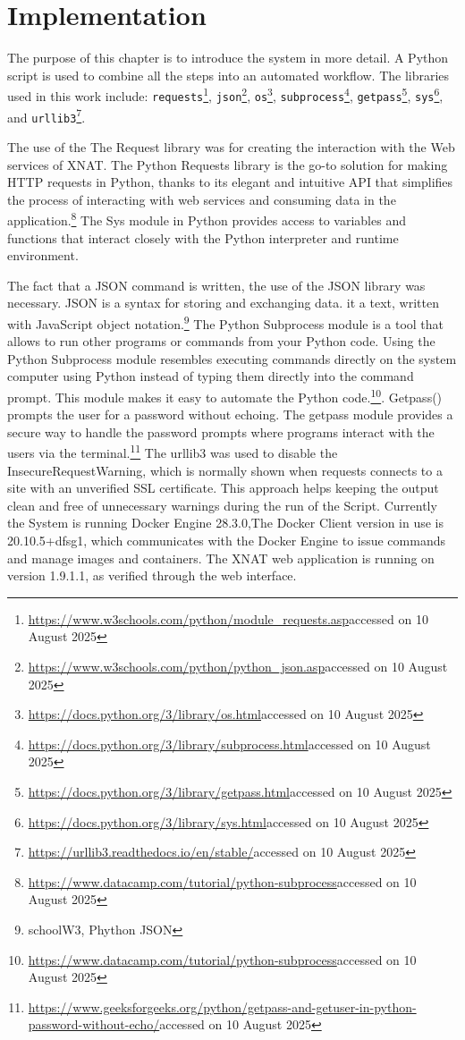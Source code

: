 \chapter{Implementation}

The purpose of this chapter is to introduce the system in more detail. A Python script is used to combine all the steps into an automated workflow. The libraries used in this work include: \texttt{requests}\footnote{\url{https://www.w3schools.com/python/module_requests.asp}accessed on 10 August 2025}, \texttt{json}\footnote{\url{https://www.w3schools.com/python/python_json.asp}accessed on 10 August 2025}, \texttt{os}\footnote{\url{https://docs.python.org/3/library/os.html}accessed on 10 August 2025}, \texttt{subprocess}\footnote{\url{https://docs.python.org/3/library/subprocess.html}accessed on 10 August 2025}, \texttt{getpass}\footnote{\url{https://docs.python.org/3/library/getpass.html}accessed on 10 August 2025}, \texttt{sys}\footnote{\url{https://docs.python.org/3/library/sys.html}accessed on 10 August 2025}, and \texttt{urllib3}\footnote{\url{https://urllib3.readthedocs.io/en/stable/}accessed on 10 August 2025}.

The use of the The Request library was for creating the interaction with the Web services of XNAT. The Python Requests library is the go-to solution for making HTTP requests in Python, thanks to its elegant and intuitive API that simplifies the process of interacting with web services and consuming data in the application.\footnote{\url{https://www.datacamp.com/tutorial/python-subprocess}accessed on 10 August 2025} The Sys module in Python provides access to variables and functions that interact closely with the Python interpreter and runtime environment. 

The fact that a JSON command is written, the use of the JSON library was necessary. JSON is a syntax for storing and exchanging data. it a text, written with JavaScript object notation.\footnote{schoolW3, Phython JSON}
The Python Subprocess module is a tool that allows to run other programs or commands from your Python code. Using the Python Subprocess module resembles executing commands directly on the system computer using Python instead of typing them directly into the command prompt. This module makes it easy to automate the Python code.\footnote{\url{https://www.datacamp.com/tutorial/python-subprocess}accessed on 10 August 2025}. Getpass() prompts the user for a password without echoing. The getpass module provides a secure way to handle the password prompts where programs interact with the users via the terminal.\footnote{\url{https://www.geeksforgeeks.org/python/getpass-and-getuser-in-python-password-without-echo/}accessed on 10 August 2025}
 The urllib3 was used to disable the InsecureRequestWarning, which is normally shown when requests connects to a site with an unverified SSL certificate. This approach helps keeping the output clean and free of unnecessary warnings during the run of the Script.
 Currently the System is running Docker Engine 28.3.0,The Docker Client version in use is 20.10.5+dfsg1, which communicates with the Docker Engine to issue commands and manage images and containers. The XNAT web application is running on version 1.9.1.1, as verified through the web interface. 
 


